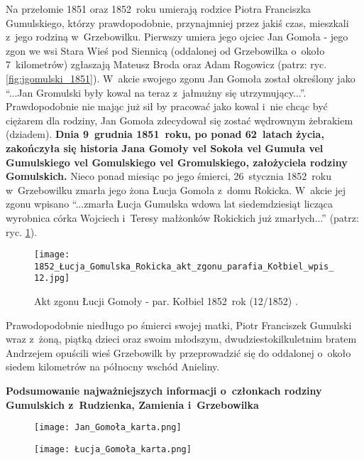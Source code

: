 Na przełomie 1851 oraz 1852~roku umierają rodzice Piotra Franciszka 
Gumulskiego, którzy prawdopodobnie, przynajmniej przez jakiś czas, mieszkali 
z~jego rodziną w~Grzebowilku. Pierwszy umiera jego ojciec Jan Gomoła - jego 
zgon we wsi Stara Wieś pod Siennicą (oddalonej od Grzebowilka o~około 
7~kilometrów) zgłaszają Mateusz Broda oraz Adam Rogowicz (patrz: ryc. 
\ref{fig:jgomulski_1851}). W~akcie swojego zgonu Jan Gomoła został określony 
jako \enquote{...Jan Gromulski były kowal na teraz z~jałmużny się 
utrzymujący...}. Prawdopodobnie nie mając już sił by pracować 
jako kowal i~nie chcąc być ciężarem dla rodziny, Jan Gomoła zdecydował się 
zostać wędrownym żebrakiem (dziadem). \textbf{Dnia 9~grudnia 1851~roku, po 
ponad 62~latach życia, zakończyła się historia Jana Gomoły vel Sokoła vel 
Gumuła vel Gumulskiego vel Gomulskiego vel Gromulskiego, założyciela rodziny 
Gomulskich.} Nieco ponad miesiąc po jego śmierci, 26~stycznia 1852~roku 
w~Grzebowilku zmarła jego żona Łucja Gomoła z~domu Rokicka. W~akcie jej zgonu 
wpisano \enquote{...zmarła Łucja Gumulska wdowa lat siedemdziesiąt licząca 
wyrobnica córka Wojciech i~Teresy małżonków Rokickich już zmarłych...} 
(patrz: ryc. \ref{fig:lgomola_1852}).

\begin{figure}[!ht]
    \vspace*{0.5cm}
    \centering \texttt{[image: 
        1852\_Łucja\_Gomulska\_Rokicka\_akt\_zgonu\_parafia\_Kołbiel\_wpis\_12.jpg]}
    \captionsetup{format=hang}
    \caption{Akt zgonu Łucji Gomoły - par. Kołbiel 1852~rok (12/1852) 
    \cite{par_kolbiel2}.}
    \label{fig:lgomola_1852}
\end{figure}

Prawodopodobnie niedługo po śmierci swojej matki, Piotr Franciszek Gumulski 
wraz z~żoną, piątką dzieci oraz swoim młodszym, dwudziestokilkuletnim bratem 
Andrzejem opuścili wieś Grzebowilk by przeprowadzić się do oddalonej o~około 
siedem kilometrów na północny wschód Anieliny.

\clearpage
\textbf{\large Podsumowanie najważniejszych informacji o~członkach rodziny 
Gumulskich z~Rudzienka, Zamienia i~Grzebowilka}

\begin{figure}[!ht]
    \vspace*{0.5cm}
    \centering \texttt{[image: Jan\_Gomoła\_karta.png]}
\end{figure}

\begin{figure}[!ht]
    \vspace*{0.5cm}
    \centering \texttt{[image: Łucja\_Gomoła\_karta.png]}
\end{figure}

